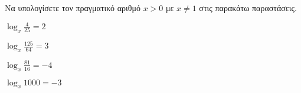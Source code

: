 Να υπολογίσετε τον πραγματικό αριθμό $ x>0$ με $ x\neq 1 $ στις παρακάτω παραστάσεις.
\begin{multicols}{2}
\begin{rlist}
\item $ \log_{x}{\frac{4}{25}}=2 $
\item $ \log_{x}{\frac{125}{64}}=3 $
\item $ \log_{x}{\frac{81}{16}}=-4 $
\item $ \log_{x}{1000}=-3 $
\end{rlist}
\end{multicols}
